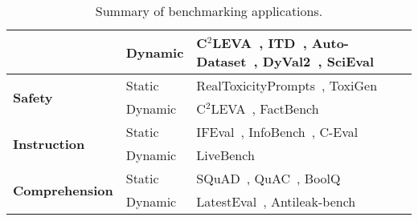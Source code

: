\begin{table*}[t!]
\begin{tabularx}{\textwidth}{llX}
          & Dynamic & C$^2$LEVA~\citep{li2024c}, ITD~\citep{zhu-etal-2024-inference}, Auto-Dataset~\citep{ying2024automating}, DyVal2~\citep{10.5555/3692070.3694661}, SciEval~\citep{sun2024scieval} \\
    \midrule
    \multirow{2}[2]{*}{\textbf{Safety}} & Static & RealToxicityPrompts~\citep{gehman-etal-2020-realtoxicityprompts}, ToxiGen~\citep{hartvigsen2022toxigen} \\
          & Dynamic & C$^2$LEVA~\citep{li2024c}, FactBench~\citep{bayat2024factbench} \\
    \midrule
    \multirow{2}[2]{*}{\textbf{Instruction}} & Static & IFEval~\citep{zhou2023instruction}, InfoBench~\citep{qin2024infobench}, C-Eval~\citep{huang2024c} \\
          & Dynamic & LiveBench~\citep{white2024livebench} \\
    \midrule
    \multirow{2}[2]{*}{\textbf{Comprehension}} & Static & SQuAD~\citep{rajpurkar2018know}, QuAC~\citep{choi2018quac}, BoolQ~\citep{clark2019boolq} \\
          & Dynamic & LatestEval~\citep{li2023avoiding}, Antileak-bench~\citep{wu2024antileak} \\
    \bottomrule
    \bottomrule
    \end{tabularx}
    
    \caption{Summary of benchmarking applications.}
    \label{tab:static-benchmarks}
\end{table*}
